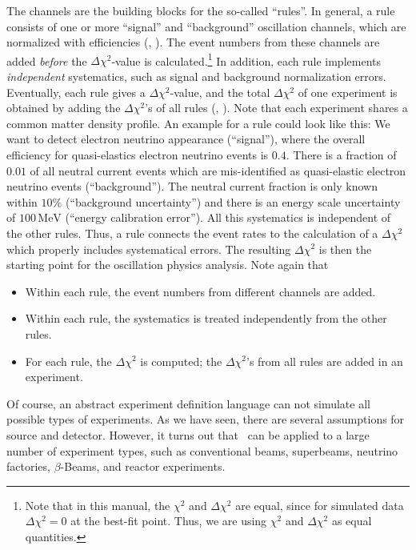 The channels are the building blocks for the so-called ``rules''.
 In general, a rule consists of one or more ``signal'' and ``background'' oscillation channels, which are normalized with efficiencies
(\cf, ). The event numbers from these channels are added {\em before} the $\Delta \chi^2$-value is calculated.\footnote{Note that
in this manual, the $\chi^2$ and $\Delta \chi^2$ are equal, since
for simulated data $\Delta \chi^2 = 0$ at the best-fit point. Thus, we
are using $\chi^2$ and $\Delta \chi^2$ as equal quantities.} In addition, each rule implements {\em independent} systematics, such as signal and background normalization errors. Eventually, each rule gives a $\Delta \chi^2$-value, and the total $\Delta \chi^2$ of one experiment is obtained by adding the $\Delta \chi^2$'s of all rules (\cf, ). Note that each experiment shares a common matter density profile. 
 An example for a rule could look like this: We want to detect electron
  neutrino appearance (``signal''), where the overall efficiency for 
  quasi-elastics electron neutrino events is $0.4$. There is a fraction of 
  $0.01$ of all neutral current events which are mis-identified as 
  quasi-elastic electron neutrino events (``background''). The neutral 
  current fraction is only known within $10\%$ (``background uncertainty'') 
  and there is
an energy scale uncertainty of $100\,\mathrm{MeV}$ (``energy calibration error'').
All this systematics is independent of the other rules.  Thus, a rule connects the event rates to the calculation of a $\Delta \chi^2$ which properly includes systematical errors. The resulting $\Delta \chi^2$ is then the starting point for the oscillation physics analysis. Note again that
\begin{itemize}
\item
 Within each rule, the event numbers from different channels are added.
\item
 Within each rule, the systematics is treated independently from the other rules.
\item
 For each rule, the $\Delta \chi^2$ is computed; the $\Delta \chi^2$'s from all rules are added in an
experiment.
\end{itemize}

Of course, an abstract experiment definition language can not simulate all possible types of experiments. As we have seen, there are several assumptions for source and detector. However, it turns out that \GLOBES\ can be applied to a large number of experiment types, such as conventional beams, superbeams, neutrino factories, $\beta$-Beams, and reactor experiments.

